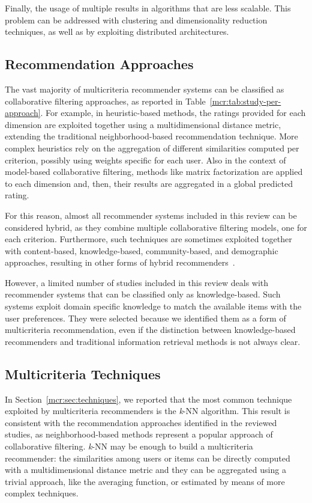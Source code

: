 Finally, the usage of multiple  results in algorithms that are less scalable. This problem can be addressed with clustering and dimensionality reduction techniques, as well as by exploiting distributed architectures.

\subsection{Recommendation Approaches}

The vast majority of multicriteria recommender systems can be classified as collaborative filtering approaches, as reported in Table~\ref{mcr:tab:study-per-approach}. For example, in heuristic-based methods, the ratings provided for each dimension are exploited together using a multidimensional distance metric, extending the traditional neighborhood-based recommendation technique. More complex heuristics rely on the aggregation of different similarities computed per criterion, possibly using weights specific for each user. Also in the context of model-based collaborative filtering, methods like matrix factorization are applied to each dimension and, then, their results are aggregated in a global predicted rating.

For this reason, almost all recommender systems included in this review can be considered hybrid, as they combine multiple collaborative filtering models, one for each criterion. Furthermore, such techniques are sometimes exploited together with content-based, knowledge-based, community-based, and demographic approaches, resulting in other forms of hybrid recommenders~\cite{Burke2007}.

However, a limited number of studies included in this review deals with recommender systems that can be classified only as knowledge-based. Such systems exploit domain specific knowledge to match the available items with the user preferences. They were selected because we identified them as a form of multicriteria recommendation, even if the distinction between knowledge-based recommenders and traditional information retrieval methods is not always clear.

\subsection{Multicriteria Techniques}

In Section~\ref{mcr:sec:techniques}, we reported that the most common technique exploited by multicriteria recommenders is the \textit{k}-NN algorithm. This result is consistent with the recommendation approaches identified in the reviewed studies, as neighborhood-based methods represent a popular approach of collaborative filtering. \textit{k}-NN may be enough to build a multicriteria recommender: the similarities among users or items can be directly computed with a multidimensional distance metric and they can be aggregated using a trivial approach, like the averaging function, or estimated by means of more complex techniques.

